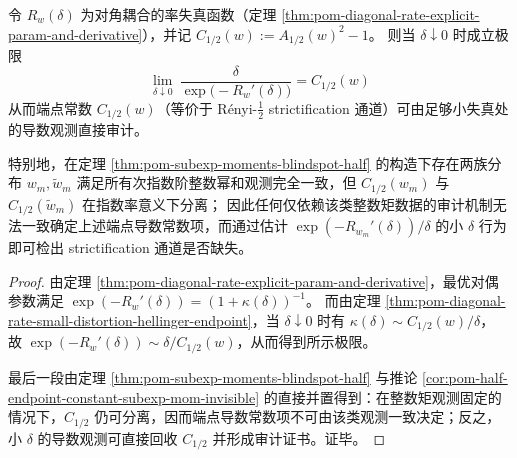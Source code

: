 \begin{proposition}\label{prop:pom-strictification-missing-auditable-by-rate-derivative}
令 \(R_w(\delta)\) 为对角耦合的率失真函数（定理 \ref{thm:pom-diagonal-rate-explicit-param-and-derivative}），并记
\(
C_{1/2}(w):=A_{1/2}(w)^2-1
\)。
则当 \(\delta\downarrow 0\) 时成立极限
\[
\boxed{\;
\lim_{\delta\downarrow 0}\ \frac{\delta}{\exp\bigl(-R_w'(\delta)\bigr)}=C_{1/2}(w)\;}
\]
从而端点常数 \(C_{1/2}(w)\)（等价于 Rényi-\(\tfrac12\) strictification 通道）可由足够小失真处的导数观测直接审计。
\par
特别地，在定理 \ref{thm:pom-subexp-moments-blindspot-half} 的构造下存在两族分布 \(w_m,\widetilde w_m\) 满足所有次指数阶整数幂和观测完全一致，但 \(C_{1/2}(w_m)\) 与 \(C_{1/2}(\widetilde w_m)\) 在指数率意义下分离；
因此任何仅依赖该类整数矩数据的审计机制无法一致确定上述端点导数常数项，而通过估计 \(\exp(-R_{w_m}'(\delta))/\delta\) 的小 \(\delta\) 行为即可检出 strictification 通道是否缺失。
\end{proposition}
\begin{proof}
由定理 \ref{thm:pom-diagonal-rate-explicit-param-and-derivative}，最优对偶参数满足
\(
\exp(-R_w'(\delta))=(1+\kappa(\delta))^{-1}
\)。
而由定理 \ref{thm:pom-diagonal-rate-small-distortion-hellinger-endpoint}，当 \(\delta\downarrow 0\) 时有
\(
\kappa(\delta)\sim C_{1/2}(w)/\delta
\)，
故
\(
\exp(-R_w'(\delta))\sim \delta/C_{1/2}(w)
\)，从而得到所示极限。
\par
最后一段由定理 \ref{thm:pom-subexp-moments-blindspot-half} 与推论 \ref{cor:pom-half-endpoint-constant-subexp-mom-invisible} 的直接并置得到：在整数矩观测固定的情况下，\(C_{1/2}\) 仍可分离，因而端点导数常数项不可由该类观测一致决定；反之，小 \(\delta\) 的导数观测可直接回收 \(C_{1/2}\) 并形成审计证书。证毕。
\end{proof}

